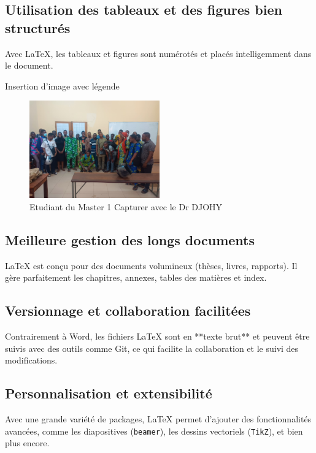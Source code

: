 \documentclass[a4paper,12pt]{article} %
\begin{document}
\subsection{Utilisation des tableaux et des figures bien structurés}
Avec \LaTeX{}, les tableaux et figures sont numérotés et placés intelligemment dans le document.

Insertion d'image avec légende
\begin{figure}[h]
    \centering
    \includegraphics[width=0.5\textwidth]{aa.jpg} %
    \caption{Etudiant du Master 1 Capturer avec le Dr DJOHY}
    \label{fig:Etudiant du Master 1 2024-2025} %
\end{figure}

\subsection{Meilleure gestion des longs documents}
\LaTeX{} est conçu pour des documents volumineux (thèses, livres, rapports). 
Il gère parfaitement les chapitres, annexes, tables des matières et index.

\subsection{Versionnage et collaboration facilitées}
Contrairement à Word, les fichiers \LaTeX{} sont en **texte brut** et peuvent être suivis avec des outils comme Git, ce qui facilite la collaboration et le suivi des modifications.

\subsection{Personnalisation et extensibilité}
Avec une grande variété de packages, \LaTeX{} permet d’ajouter des fonctionnalités avancées, 
comme les diapositives (\texttt{beamer}), les dessins vectoriels (\texttt{TikZ}), et bien plus encore.
\end{document}
